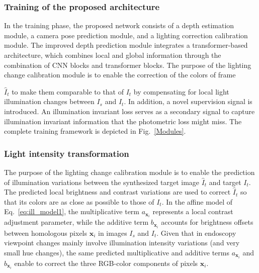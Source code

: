 \documentclass[a4paper,fleqn]{cas-dc}
\begin{document}
\subsubsection{Training of the proposed architecture\label{sec:sst}}
%
In the training phase, the proposed network consists of a depth estimation module, a camera pose prediction module, and a lighting correction calibration module. The improved depth prediction module integrates a transformer-based architecture, which combines local and global information through the combination of CNN blocks and transformer blocks. The purpose of the lighting change calibration module is to enable the correction of the colors of frame {$\hat{I}_{t}$ to make them comparable to that of $I_t$ by compensating for local light illumination changes between $I_s$ and $I_t$. 
In addition, a novel supervision signal is introduced. An illumination invariant loss serves as a secondary signal to capture illumination invariant information that the photometric loss might miss. The complete training framework is depicted in Fig.~\ref{Modules}. 

\subsubsection{Light intensity transformation\label{sec:lit}}
%
The purpose of the lighting change calibration module is to enable the prediction of illumination variations between the synthesized target image $\hat{I}_t$ and target $I_t$. The predicted local brightness and contrast variations are used to correct $\hat{I}_t$ so that its colors are as close as possible to those of $I_t$. In the affine model of Eq.~\eqref{eq:ill_model1}, the multiplicative term $a_{\mathbf{x}_i}$ represents a local contrast adjustment parameter, while the additive term $b_{\mathbf{x}_i}$ accounts for brightness offsets between homologous pixels $\mathbf{x}_i$ in images $I_s$ and $I_t$. Given that in endoscopy viewpoint changes mainly involve illumination intensity variations (and very small hue changes), the same predicted multiplicative and additive terms $a_{\mathbf{x}_i}$ and $b_{\mathbf{x}_i}$ enable to correct the three RGB-color components of pixels $\mathbf{x}_i$. 

}
\end{document}
